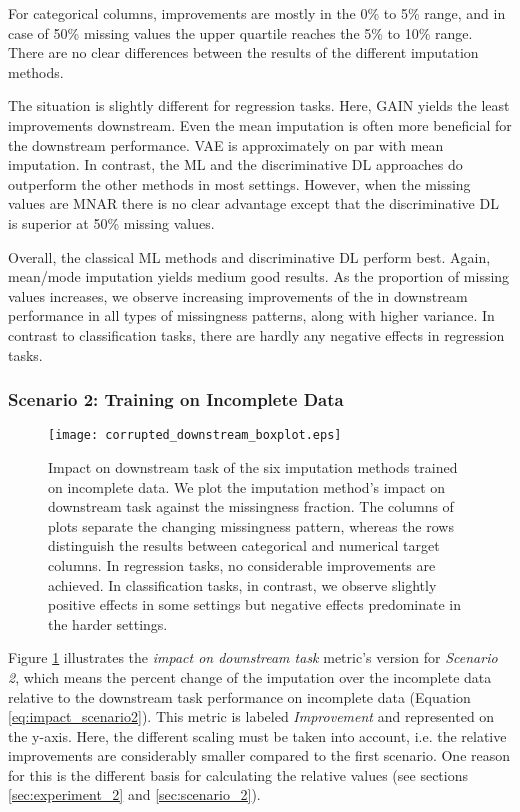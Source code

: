 For categorical columns, improvements are mostly in the 0\% to 5\% range, and in case of 50\% missing values the upper quartile reaches the 5\% to 10\% range. There are no clear differences between the results of the different imputation methods.

The situation is slightly different for regression tasks. Here, GAIN yields the least improvements downstream. Even the mean imputation is often more beneficial for the downstream performance. VAE is approximately on par with mean imputation. In contrast, the ML and the discriminative DL approaches do outperform the other methods in most settings. However, when the missing values are MNAR there is no clear advantage except that the discriminative DL is superior at 50\% missing values.

Overall, the classical ML methods and discriminative DL perform best. Again, mean/mode imputation yields medium good results. As the proportion of missing values increases, we observe increasing improvements of the in downstream performance in all types of missingness patterns, along with higher variance. In contrast to classification tasks, there are hardly any negative effects in regression tasks.


\subsubsection{Scenario 2: Training on Incomplete Data}

\begin{figure}\centering
	\texttt{[image: corrupted\_downstream\_boxplot.eps]}

	\caption[Downstream Ranks - Corrupted]{Impact on downstream task of the six imputation methods trained on incomplete data. We plot the imputation method's impact on downstream task against the missingness fraction. The columns of plots separate the changing missingness pattern, whereas the rows distinguish the results between categorical and numerical target columns. In regression tasks, no considerable improvements are achieved. In classification tasks, in contrast, we observe slightly positive effects in some settings but negative effects predominate in the harder settings.
    }
	\label{fig:corrupted_downstream_boxplot}
\end{figure}

Figure \ref{fig:corrupted_downstream_boxplot} illustrates the \textit{impact on downstream task} metric's version for \textit{Scenario 2}, which means the percent change of the imputation over the incomplete data relative to the downstream task performance on incomplete data (Equation \ref{eq:impact_scenario2}). This metric is labeled \textit{Improvement} and represented on the y-axis. Here, the different scaling must be taken into account, i.e. the relative improvements are considerably smaller compared to the first scenario. One reason for this is the different basis for calculating the relative values (see sections \ref{sec:experiment_2} and \ref{sec:scenario_2}).

